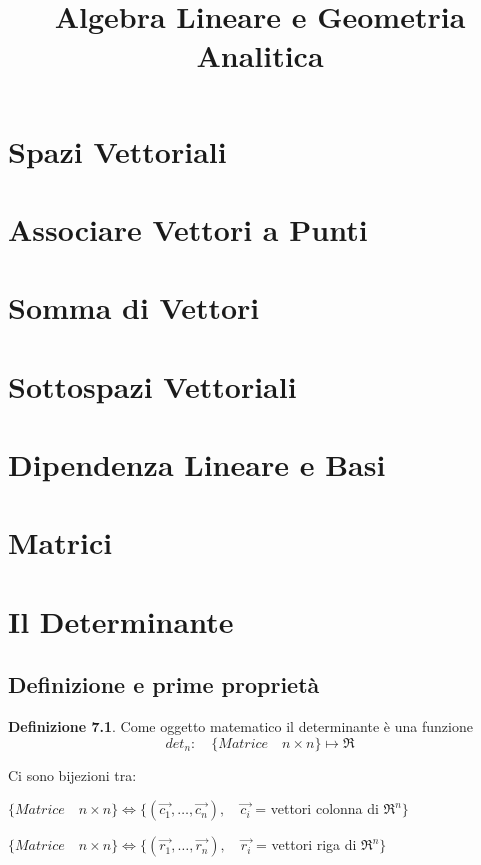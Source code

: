 \documentclass[a4paper]{report}
\title{Algebra Lineare e Geometria Analitica}
\theoremstyle{remark}
\theoremstyle{definition}
\newtheorem{detDef}{Definizione}
\begin{document}
%
\maketitle
%
\tableofcontents
%
\pagestyle{headings}
%
\chapter{Spazi Vettoriali}
\chapter{Associare Vettori a Punti}
\chapter{Somma di Vettori}
\chapter{Sottospazi Vettoriali}
\chapter{Dipendenza Lineare e Basi}
\chapter{Matrici}
%
\chapter{Il Determinante}
%
\section{Definizione e prime proprietà}
\label{detProp}

\begin{shaded}
\begin{detDef}
	Come oggetto matematico il determinante è una funzione  
	\[
	{det_n: \quad \{Matrice\quad n\times n \} \longmapsto \Re }
	\]
\end{detDef}
\end{shaded}
%
Ci sono bijezioni tra:

$\{Matrice \quad n\times n \} \iff \{(\vec{c_1}, \dots{} , \vec{c_n}),\quad \vec{c_i}$ = vettori colonna di $\Re^{n}\}$

$\{Matrice \quad n\times n \} \iff \{(\vec{r_1}, \dots{} , \vec{r_n}),\quad \vec{r_i}$ = vettori riga di $\Re^{n}\}$
\end{document}
